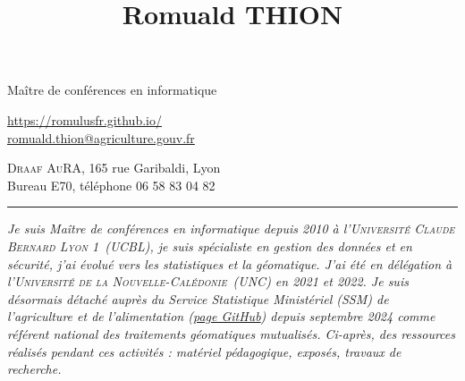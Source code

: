 \documentclass[12pt,a4paper]{article}
\title{{Romuald THION}}
\newcommand{\hr}{\textcolor{gris80}{\rule{\linewidth}{0.5pt}}}
\newcommand{\UCBL}{\textsc{Universit{\'e} Claude Bernard Lyon 1}\xspace}
\newcommand{\UNC}{\textsc{Universit{\'e} de la Nouvelle-Calédonie}\xspace}
\newcommand{\DRAAF}{\textsc{Draaf AuRA}\xspace}
\begin{document}


    Maître de conférences en informatique
    
    \url{https://romulusfr.github.io/}\\ %
    \href{mailto:romuald.thion@agriculture.gouv.fr}{romuald.thion@agriculture.gouv.fr}
    
    \DRAAF, 165 rue Garibaldi, Lyon\\
    Bureau E70, téléphone 06 58 83 04 82


\hr

\begin{center}
  \emph{
    Je suis Maître de conférences en informatique depuis 2010 à l'\UCBL~(UCBL), je suis spécialiste en gestion des données et en sécurité, j'ai évolué vers les statistiques et la géomatique.
  J'ai été en délégation à l'\UNC~(UNC) en 2021 et 2022.
  Je suis désormais détaché auprès du Service Statistique Ministériel (SSM) de l'agriculture et de l'alimentation (\href{https://ssm-agriculture.github.io/}{page GitHub}) depuis septembre 2024 comme référent national des traitements géomatiques mutualisés.
  Ci-après, des ressources réalisés pendant ces activités : matériel pédagogique, exposés, travaux de recherche.
  }
\end{center}
\end{document}
